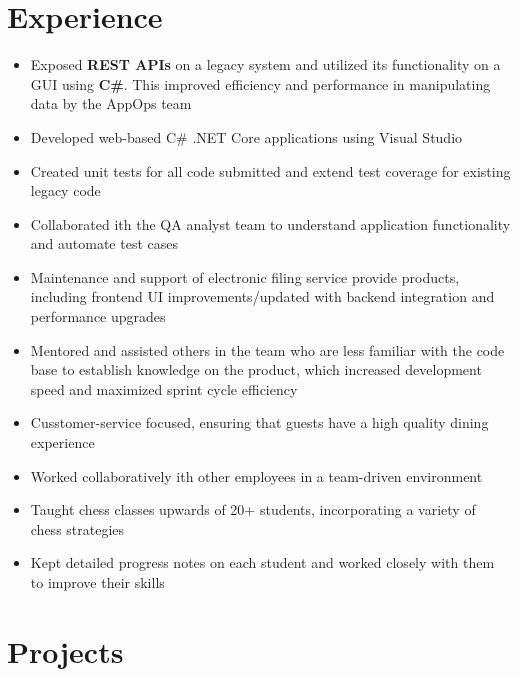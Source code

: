 \documentclass{fortythree_resume}
\begin{document}
\hfill
\begin{minipage}[t]{0.66\textwidth} 

\section{Experience}
\begin{itemize}
	\item Exposed \textbf{REST APIs} on a legacy system and utilized its functionality on a GUI using \textbf{C\#}. This improved efficiency and performance in manipulating data by the AppOps team
	\item Developed web-based C\# .NET Core applications using Visual Studio
	\item Created unit tests for all code submitted and extend test coverage for existing legacy code
	\item Collaborated ith the QA analyst team to understand application functionality and automate test cases
	\item Maintenance and support of electronic filing service provide products, including frontend UI improvements/updated with backend integration and performance upgrades
	\item Mentored and assisted others in the team who are less familiar with the code base to establish knowledge on the product, which increased development speed and maximized sprint cycle efficiency
\end{itemize}

\begin{itemize}
	\item Cusstomer-service focused, ensuring that guests have a high quality dining experience
	\item Worked collaboratively ith other employees in a team-driven environment
\end{itemize}

\begin{itemize}
	\item Taught chess classes upwards of 20+ students, incorporating a variety of chess strategies
	\item Kept detailed progress notes on each student and worked closely with them to improve their skills
\end{itemize}

\sectionsep

\section{Projects}
\sectionsep

\end{minipage}
\end{document}
